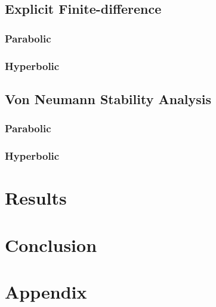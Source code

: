 \documentclass[iop]{emulateapj}
\begin{document}
		\subsection{Explicit Finite-difference}
			\subsubsection{Parabolic}
			\subsubsection{Hyperbolic}
		\subsection{Von Neumann Stability Analysis}
			\subsubsection{Parabolic}
			\subsubsection{Hyperbolic}
	\section{Results}
	\section{Conclusion}
	\section{Appendix}
			
	
	
	
	\begin{acronym}
	\end{acronym}
	
\end{document}
